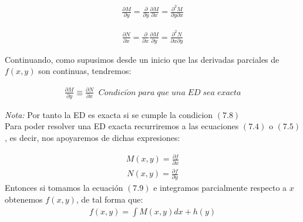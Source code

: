 \begin{equation}
    \begin{gathered}
        \frac{\partial{M}}{\partial{y}}=\frac{\partial}{\partial{y}}\frac{\partial{M}}{\partial{x}}=\frac{\partial^{2}{M}}{\partial{y}\partial{x}}
    \end{gathered}
\end{equation}

\begin{equation}
    \begin{gathered}
        \frac{\partial{N}}{\partial{x}}=\frac{\partial}{\partial{x}}\frac{\partial{M}}{\partial{y}}=\frac{\partial^{2}{N}}{\partial{x}\partial{y}}
    \end{gathered}
\end{equation}

Continuando, como supusimos desde un inicio que las derivadas parciales de \(\displaystyle f(x,y)\) son continuas, tendremos:

\begin{equation}
    \begin{gathered}
        \frac{\partial{M}}{\partial{y}}\equiv \frac{\partial{N}}{\partial{x}}\;\;Condici\acute{o}n\;para\;que\;una\;ED\;sea\;exacta
    \end{gathered}
\end{equation}

\textit{Nota:} Por tanto la ED es exacta si se cumple la condicion \(\displaystyle (7.8)\)\\

Para poder resolver una ED exacta recurriremos a las ecuaciones \(\displaystyle (7.4)\) o \(\displaystyle (7.5)\), es decir, nos apoyaremos de dichas expresiones:

\begin{equation}
    \begin{gathered}
        M(x,y)=\frac{\partial{f}}{\partial{x}}
    \end{gathered}
\end{equation}
\begin{equation}
    \begin{gathered}
        N(x,y)=\frac{\partial{f}}{\partial{y}}
    \end{gathered}
\end{equation}
Entonces si tomamos la ecuación \(\displaystyle (7.9)\) e integramos parcialmente respecto a \(\displaystyle x\) obtenemos \(\displaystyle f(x,y)\), de tal forma que:
\begin{equation}
    \begin{gathered}
        f(x,y)=\int M(x,y)dx+h(y)
    \end{gathered}
\end{equation}

